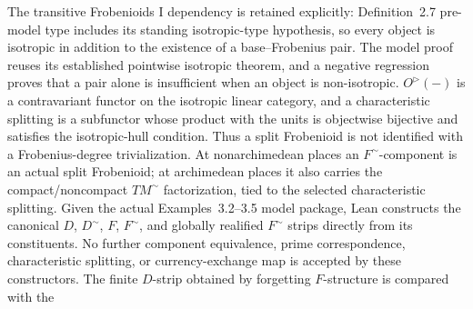 \begin{definition}
  \leanok
  The transitive Frobenioids I dependency is retained explicitly:
  Definition~2.7 pre-model type includes its standing isotropic-type
  hypothesis, so every object is isotropic in addition to the existence of a
  base--Frobenius pair.  The model proof reuses its established pointwise
  isotropic theorem, and a negative regression proves that a pair alone is
  insufficient when an object is non-isotropic.
  \(O^\triangleright(-)\) is a contravariant functor on the isotropic
  linear category, and a characteristic splitting is a subfunctor whose
  product with the units is objectwise bijective and satisfies the
  isotropic-hull condition.  Thus a split Frobenioid is not identified with
  a Frobenius-degree trivialization.  At nonarchimedean places an
  \(F^{\sim}\)-component is an actual split Frobenioid; at archimedean
  places it also carries the compact/noncompact \(TM^{\sim}\)
  factorization, tied to the selected characteristic splitting.
  Given the actual Examples~3.2--3.5 model package, Lean constructs the
  canonical \(D\), \(D^{\sim}\), \(F\), \(F^{\sim}\), and globally realified
  \(F^{\sim}\) strips directly from its constituents.  No further component
  equivalence, prime correspondence, characteristic splitting, or
  currency-exchange map is accepted by these constructors.  The finite
  \(D\)-strip obtained by forgetting \(F\)-structure is compared with the

\end{definition}
